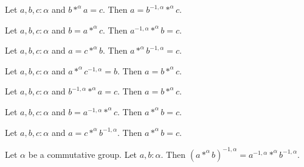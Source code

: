 \documentclass{article}
\begin{document}
\begin{forthel}
\begin{lemma}[title=eq inv mul of mul eq]
Let $a,b,c : \alpha$ and $b *^{\alpha} a = c$.
Then $a = b^{-1,\alpha} *^{\alpha} c$.
\end{lemma}

\begin{lemma}[title=inv mul eq of eq mul]
Let $a,b,c : \alpha$ and $b = a *^{\alpha} c$.
Then $a^{-1,\alpha} *^{\alpha} b = c$.
\end{lemma}

\begin{lemma}[title=mul inv eq of eq mul]
Let $a,b,c : \alpha$ and $a = c *^{\alpha} b$.
Then $a *^{\alpha} b^{-1,\alpha} = c$.
\end{lemma}

\begin{lemma}[title=eq mul of mul inv eq]
Let $a,b,c : \alpha$ and $a *^{\alpha} c^{-1,\alpha} = b$.
Then $a = b *^{\alpha} c$.
\end{lemma}

\begin{lemma}[title=eq mul of inv mul eq]
Let $a,b,c : \alpha$ and $b^{-1,\alpha} *^{\alpha} a = c$.
Then $a = b *^{\alpha} c$.
\end{lemma}

\begin{lemma}[title=mul eq of eq inv mul]
Let $a,b,c : \alpha$ and $b = a^{-1,\alpha} *^{\alpha} c$.
Then $a *^{\alpha} b = c$.
\end{lemma}

\begin{lemma}[title=mul eq of eq mul inv]
Let $a,b,c : \alpha$ and $a = c *^{\alpha} b^{-1,\alpha}$.
Then $a *^{\alpha} b = c$.
\end{lemma}

\begin{lemma}[title=mul inv]
Let $\alpha$ be a commutative group.
Let $a,b : \alpha$.
Then $(a *^{\alpha} b)^{-1,\alpha} = a^{-1,\alpha} *^{\alpha} b^{-1,\alpha}$.
\end{lemma}

\end{forthel}
\end{document}

